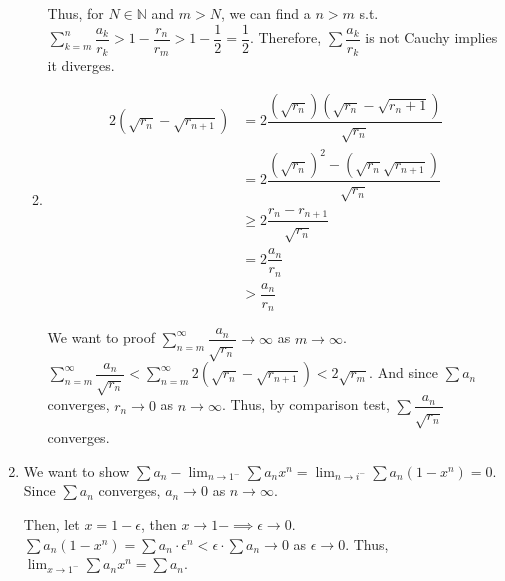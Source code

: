 \documentclass[12pt]{article}
\begin{document}
\begin{enumerate}
\begin{enumerate}
        Thus, for $N \in \mathbb{N}$ and $m > N$, we can find a $n > m$ s.t. 
        $\displaystyle\sum_{k=m}^{n} \dfrac{a_k}{r_k} > 1- \dfrac{r_n}{r_m} > 1 - \dfrac{1}{2} = \dfrac{1}{2}$.
        Therefore, $\displaystyle\sum \dfrac{a_k}{r_k}$ is not Cauchy implies it diverges.


        \item \begin{align*}
            2(\sqrt{r_n} - \sqrt{r_{n+1}}) &= 2\dfrac{(\sqrt{r_n})(\sqrt{r_n} -\sqrt{r_n + 1})}{\sqrt{r_n}}\\
            &= 2 \dfrac{(\sqrt{r_n})^2 - (\sqrt{r_n}\sqrt{r_{n + 1}})}{\sqrt{r_n}}\\
            &\geq 2\dfrac{r_n - r_{n + 1}}{\sqrt{r_n}}\\
            &= 2\dfrac{a_n}{r_n}\\
            &> \dfrac{a_n}{r_n}
        \end{align*}
        
        We want to proof $\displaystyle\sum_{n=m}^{\infty} \dfrac{a_n}{\sqrt{r_n}} \to \infty$ as $m \to \infty$.
        $\displaystyle\sum_{n=m}^{\infty} \dfrac{a_n}{\sqrt{r_n}} < \displaystyle\sum_{n=m}^{\infty} 2(\sqrt{r_n} - \sqrt{r_{n+1}}) < 2\sqrt{r_m}$.
        And since $\sum a_n$ converges, $r_n \to 0$ as $n \to \infty$.
        Thus, by comparison test, $\sum \dfrac{a_n}{\sqrt{r_n}}$ converges.
    \end{enumerate}

    \item We want to show $\sum a_n - \displaystyle\lim_{n\to 1^-} \sum a_nx^n = \displaystyle\lim_{n\to i^-}\sum  a_n (1 - x^n) = 0$.
    Since $\sum a_n$ converges, $a_n\to 0$ as $n\to \infty$.
    
    Then, let $x = 1-\epsilon$, then $x \to 1- \implies \epsilon \to 0$.
    $\sum a_n(1-x^n) = \sum a_n \cdot \epsilon^n < \epsilon\cdot\sum a_n \to 0$ as $\epsilon \to 0$.
    Thus, $\displaystyle\lim_{x\to 1^-} \sum a_n x^n = \sum a_n$.
\end{enumerate}
\end{document}
